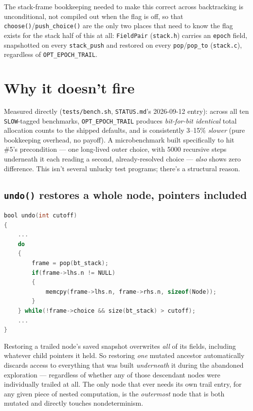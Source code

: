 \documentclass[11pt]{article}
\begin{document}
The stack-frame bookkeeping needed to make this correct across
backtracking is unconditional, not compiled out when the flag is off, so
that \texttt{choose()}/\texttt{push\_choice()} are the only two places
that need to know the flag exists for the stack half of this at all:
\texttt{FieldPair} (\texttt{stack.h}) carries an \texttt{epoch} field,
snapshotted on every \texttt{stack\_push} and restored on every
\texttt{pop}/\texttt{pop\_to} (\texttt{stack.c}), regardless of
\texttt{OPT\_\allowbreak EPOCH\_\allowbreak TRAIL}.

\section{Why it doesn't fire}
\label{sec:why-not}

Measured directly (\texttt{tests/bench.sh}, \texttt{STATUS.md}'s
2026-09-12 entry): across all ten \texttt{SLOW}-tagged benchmarks,
\texttt{OPT\_\allowbreak EPOCH\_\allowbreak TRAIL} produces \emph{bit-for-bit identical} total
allocation counts to the shipped defaults, and is consistently 3--15\%
\emph{slower} (pure bookkeeping overhead, no payoff). A microbenchmark
built specifically to hit \#5's precondition --- one long-lived outer
choice, with 5000 recursive steps underneath it each reading a second,
already-resolved choice --- \emph{also} shows zero difference. This isn't
several unlucky test programs; there's a structural reason.

\subsection{\texttt{undo()} restores a whole node, pointers included}

\begin{lstlisting}[language=C]
bool undo(int cutoff)
{
    ...
    do
    {
        frame = pop(bt_stack);
        if(frame->lhs.n != NULL)
        {
            memcpy(frame->lhs.n, frame->rhs.n, sizeof(Node));
        }
    } while(!frame->choice && size(bt_stack) > cutoff);
    ...
}
\end{lstlisting}

Restoring a trailed node's saved snapshot overwrites \emph{all} of its
fields, including whatever child pointers it held. So restoring \emph{one}
mutated ancestor automatically discards access to everything that was
built \emph{underneath} it during the abandoned exploration --- regardless
of whether any of those descendant nodes were individually trailed at all.
The only node that ever needs its own trail entry, for any given piece of
nested computation, is the \emph{outermost} node that is both mutated and
directly touches nondeterminism.
\end{document}
